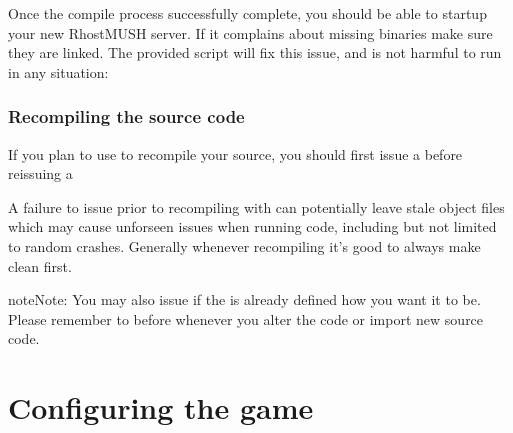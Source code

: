 \documentclass[letterpaper,10pt,english]{sphinxmanual}
\begin{document}
\begin{sphinxVerbatim}[commandchars=\\\{\}]
 
\end{sphinxVerbatim}

\sphinxAtStartPar
Once the compile process successfully complete, you should be able to start\sphinxhyphen{}up
your new RhostMUSH server. If it complains about missing binaries make sure
they are linked. The provided script will fix this issue, and is not harmful
to run in any situation:

\begin{sphinxVerbatim}[commandchars=\\\{\}]
 
\end{sphinxVerbatim}


\subsubsection{Recompiling the source code}
\label{\detokenize{install:recompiling-the-source-code}}
\sphinxAtStartPar
If you plan to use  to recompile your source, you should
first issue a  before re\sphinxhyphen{}issuing a 

\sphinxAtStartPar
A failure to issue  prior to re\sphinxhyphen{}compiling with 
can potentially leave stale object files which may cause unforseen issues when
running code, including but not limited to random crashes.  Generally whenever
recompiling it’s good to always make clean first.

\begin{sphinxadmonition}{note}{Note:}
\sphinxAtStartPar
You may also issue  if the  is already defined how
you want it to be.  Please remember to  before 
whenever you alter the code or import new source code.
\end{sphinxadmonition}


\section{Configuring the game}
\label{\detokenize{install:configuring-the-game}}
\end{document}
